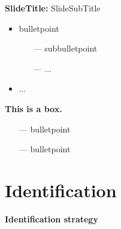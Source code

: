 \documentclass{beamer} %
\begin{document}
\begin{frame}{\textbf{SlideTitle:} SlideSubTitle}
	\begin{itemize}
	    \item bulletpoint
    	\begin{itemize}
    	    \item[---] subbulletpoint
    	    \item[---] ...
    	\end{itemize}
    	\item ...
	\end{itemize}
	\vspace{.4cm}
	\begin{finding*}
	{\hspace{-.4cm}\textcolor{ifo-blue}{\textbf{This is a box.}}}{
	    \begin{itemize}
	        \item[---] bulletpoint
	        \item[---] bulletpoint
	    \end{itemize}
	}
	\end{finding*}
\end{frame}

\section{Identification}
{
	\begin{frame}[plain]		
		\vspace{1cm}
		{\color{white}\LARGE \textbf{Identification strategy}}
	\end{frame}
	\addtocounter{framenumber}{-1}
}
\end{document}
